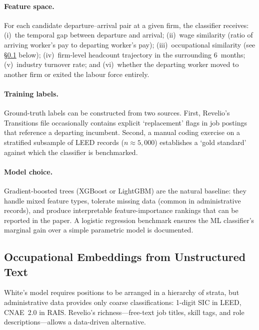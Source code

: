 \documentclass[a4paper]{tufte-handout}
\begin{document}
\paragraph{Feature space.}
For each candidate departure--arrival pair at a given firm, the classifier receives: (i)~the temporal gap between departure and arrival; (ii)~wage similarity (ratio of arriving worker's pay to departing worker's pay); (iii)~occupational similarity (see §\ref{sec:embeddings} below); (iv)~firm-level headcount trajectory in the surrounding 6~months; (v)~industry turnover rate; and (vi)~whether the departing worker moved to another firm or exited the labour force entirely.

\paragraph{Training labels.}
Ground-truth labels can be constructed from two sources. First, Revelio's Transitions file occasionally contains explicit `replacement' flags in job postings that reference a departing incumbent. Second, a manual coding exercise on a stratified subsample of LEED records ($n \approx 5{,}000$) establishes a `gold standard' against which the classifier is benchmarked.

\paragraph{Model choice.}
Gradient-boosted trees (XGBoost or LightGBM) are the natural baseline: they handle mixed feature types, tolerate missing data (common in administrative records), and produce interpretable feature-importance rankings that can be reported in the paper. A logistic regression benchmark ensures the ML classifier's marginal gain over a simple parametric model is documented.


\subsection{Occupational Embeddings from Unstructured Text}
\label{sec:embeddings}

White's model requires positions to be arranged in a hierarchy of strata, but administrative data provides only coarse classifications: 1-digit SIC in LEED, CNAE~2.0 in RAIS\@. Revelio's richness---free-text job titles, skill tags, and role descriptions---allows a data-driven alternative.
\end{document}
